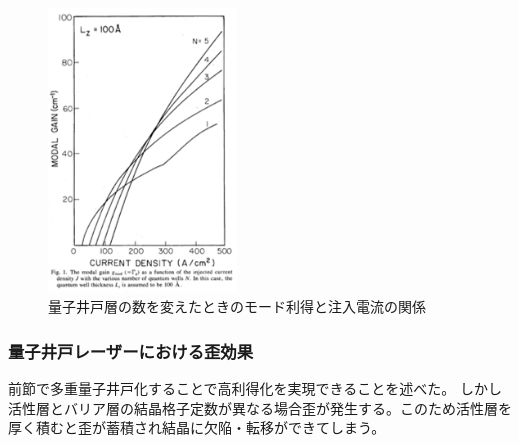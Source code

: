 \begin{figure}[h]
	\centering
	\includegraphics[width=5cm]{figure/fig_1_1_gain_mode.png}
	\caption{量子井戸層の数を変えたときのモード利得と注入電流の関係}
	\label{fig:fig_gain_mode}
\end{figure}





\subsubsection{量子井戸レーザーにおける歪効果}
前節で多重量子井戸化することで高利得化を実現できることを述べた。
しかし活性層とバリア層の結晶格子定数が異なる場合歪が発生する。このため活性層を厚く積むと歪が蓄積され結晶に欠陥・転移ができてしまう。


